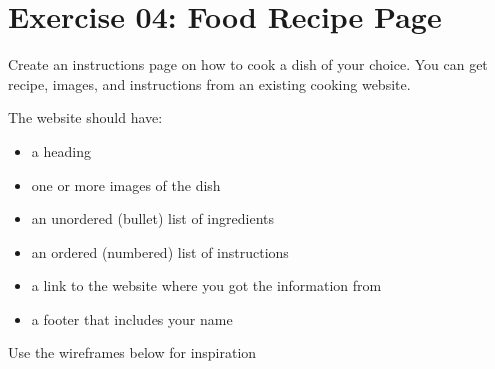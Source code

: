 \documentclass{42-en}
\begin{document}
\chapter{Exercise 04: Food Recipe Page}

\exnumber{\exercicenumber}

\makeheaderfiles

Create an instructions page on how to cook a dish of your choice. You can get recipe, images, and instructions from an existing cooking website.\par
\vspace{.1in}
The website should have:
\begin{itemize}
    \item a heading
    \item one or more images of the dish
    \item an unordered (bullet) list of ingredients
    \item an ordered (numbered) list of instructions
    \item a link to the website where you got the information from
    \item a footer that includes your name
\end{itemize}
\vspace{.5in}
Use the wireframes below for inspiration
\end{document}
